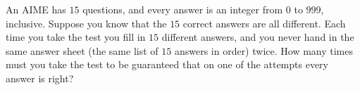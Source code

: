 An AIME has $15$ questions, and every answer is an integer from $0$ to $999$, inclusive. Suppose you know that the $15$ correct answers are all different. Each time you take the test you fill in $15$ different answers, and you never hand in the same answer sheet (the same list of $15$ answers in order) twice. How many times must you take the test to be guaranteed that on one of the attempts every answer is right?
